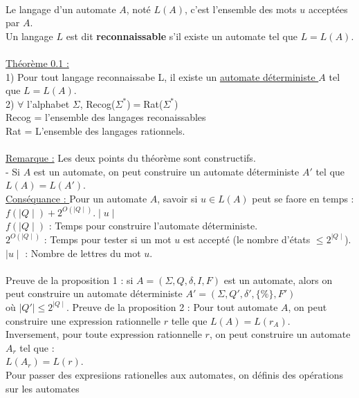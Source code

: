 \documentclass{article}
\begin{document}
    \\
    Le langage d'un automate $A$, noté $L(A)$, c'est l'ensemble des mots $u$ acceptées par $A$. \\
    Un langage $L$ est dit \textbf{reconnaissable} s'il existe un automate tel que $L=L(A)$. \\
    \\
    \underline{Théorème 0.1 :} \\
    1) Pour tout langage reconnaissabe L, il existe un \underline{automate déterministe $A$} tel que $L=L(A)$. \\
    2) $\forall$ l'alphabet $\Sigma$, Recog($\Sigma^*$)$=$Rat($\Sigma^*$) \\
    Recog = l'ensemble des langages reconaissables \\
    Rat = L'ensemble des langages rationnels. \\
    \\
    \underline{Remarque :} Les deux points du théorème sont constructifs. \\ 
    - Si $A$ est un automate, on peut construire un automate déterministe $A'$ tel que $L(A)=L(A')$. \\
    \underline{Conséquance : } Pour un automate $A$, savoir si $u \in L(A)$ peut se faore en temps : \\ 
    $f(\mid Q \mid)+2^{O(\mid Q \mid)}.\mid u \mid$ \\ 
    $f(\mid Q \mid)$ : Temps pour construire l'automate déterministe. \\
    $2^{O(\mid Q \mid)}$ : Temps pour tester si un mot $u$ est accepté (le nombre d'états $\le 2^{\mid Q \mid}$). \\
    $\mid u \mid$ : Nombre de lettres du mot $u$. \\
    \\ 
    Preuve de la proposition 1 : si $A=(\Sigma, Q, \delta, I, F)$ est un automate, alors on peut construire un automate déterministe $A'=(\Sigma, Q', \delta', \{\%\}, F')$\\
    où $\mid Q' \mid \le 2^{\mid Q \mid}$. \newpage
    Preuve de la proposition 2 : Pour tout automate $A$, on peut construire une expression rationnelle $r$ telle que $L(A)=L(r_{A})$. \\
    Inversement, pour toute expression rationnelle $r$, on peut construire un automate $A_r$ tel que : \\
    $L(A_r)=L(r)$. \\
    Pour passer des expresiions rationelles aux automates, on définis des opérations sur les automates 
\end{document}
